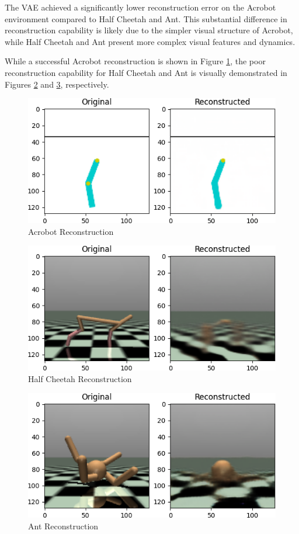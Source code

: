 The VAE achieved a significantly lower reconstruction error on
the Acrobot environment compared to Half Cheetah and Ant.
This substantial difference in reconstruction capability is likely due
to the simpler visual structure of Acrobot, while Half Cheetah and Ant
present more complex visual features and dynamics.

While a successful Acrobot reconstruction is shown
in Figure \ref{fig:acrobot_recon},
the poor reconstruction capability for Half Cheetah and Ant
is visually demonstrated in Figures \ref{fig:half_cheetah_recon} and
\ref{fig:ant_recon}, respectively.

\begin{figure}[h]
    \centering
    \includegraphics[width=.8\textwidth]{figures/ch5/ae_acrobot.png}
    \caption{Acrobot Reconstruction}
    \label{fig:acrobot_recon}
\end{figure}

\begin{figure}[h]
    \centering
    \includegraphics[width=.8\textwidth]{figures/ch5/ae_half_cheetah.png}
    \caption{Half Cheetah Reconstruction}
    \label{fig:half_cheetah_recon}
\end{figure}

\begin{figure}[h]
    \centering
    \includegraphics[width=.8\textwidth]{figures/ch5/ae_ant.png}
    \caption{Ant Reconstruction}
    \label{fig:ant_recon}
\end{figure}


